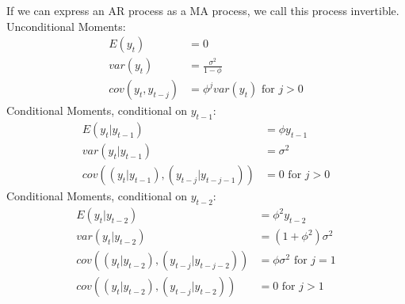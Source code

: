 \documentclass[a4paper]{scrartcl}
\begin{document}
\begin{enumerate}
\begin{solution}
\begin{itemize}
                  \end{itemize}
                  If we can express an AR process as a MA process, we call this process invertible.\\
                  Unconditional Moments:
                  \begin{align*}
                      E(y_t)           & = 0                                \\
                      var(y_t)         & = \frac{\sigma^2}{1-\phi}          \\
                      cov(y_t,y_{t-j}) & = \phi^j var(y_t) \text{ for } j>0
                  \end{align*}
                  Conditional Moments, conditional on $y_{t-1}$:
                  \begin{align*}
                      E(y_t|y_{t-1})                         & = \phi y_{t-1}       \\
                      var(y_t|y_{t-1})                       & = \sigma^2           \\
                      cov((y_t|y_{t-1}),(y_{t-j}|y_{t-j-1})) & = 0 \text{ for } j>0
                  \end{align*}
                  Conditional Moments, conditional on $y_{t-2}$:
                  \begin{align*}
                      E(y_t|y_{t-2})                         & = \phi^2 y_{t-2}                \\
                      var(y_t|y_{t-2})                       & = (1+\phi^2)\sigma^2            \\
                      cov((y_t|y_{t-2}),(y_{t-j}|y_{t-j-2})) & = \phi\sigma^2 \text{ for } j=1 \\
                      cov((y_t|y_{t-2}),(y_{t-j}|y_{t-2}))   & = 0 \text{ for } j>1
                  \end{align*}
                  

\end{solution}
\end{enumerate}
\end{document}

